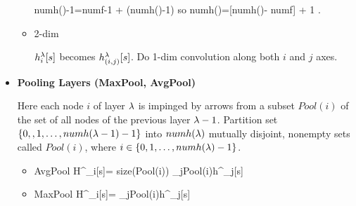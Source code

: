 \begin{itemize}
\begin{itemize}
\beq
numh()-1=numf-1 +
(numh(\lam)-1)\sigma
\;
\eeq
so
\beq
numh(\lam)=[numh()-
numf] + 1
\;.
\eeq
\item 2-dim

$h_i^\lambda[s]$ becomes
$h_{(i,j)}^\lambda[s]$.
Do 1-dim convolution
along both $i$ and $j$ axes.

\end{itemize}
\item{\bf Pooling Layers 
(MaxPool, AvgPool)}

Here each node $i$ 
of layer $\lambda$ is impinged by
arrows from  a subset $Pool(i)$
of the set of all
nodes of the previous layer $\lambda-1$.
Partition set
$\{0,,1,\dots,numh(\lambda-1)-1\}
$ into $numh(\lambda)$ mutually
disjoint, nonempty sets
called $Pool(i)$, where
$i\in \{0, 1, \ldots,numh(\lambda)-1\}$.

\begin{itemize}
\item AvgPool
\beq
H^\lam_i[s]=
{size(Pool(i))}
\sum_{j\in Pool(i)}h^{}_j[s]
\eeq
\item MaxPool
\beq
H^\lam_i[s]=
\max_{j\in Pool(i)}h^{}_j[s]
\eeq

\end{itemize}


\end{itemize}

